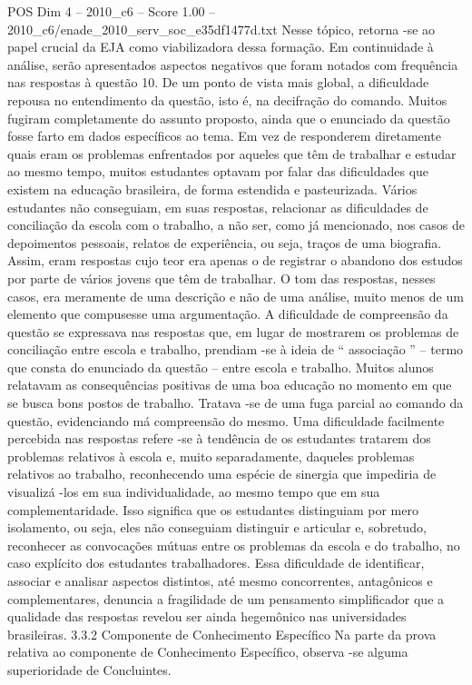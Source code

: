 \begin{textsample}{POS Dim 4 – 2010\_c6 – Score 1.00 – 2010\_c6/enade\_2010\_serv\_soc\_e35df1477d.txt}
Nesse tópico, retorna -se ao papel crucial da EJA como viabilizadora dessa formação.
Em continuidade à análise, serão apresentados aspectos negativos que foram notados com frequência nas respostas à questão 10.
De um ponto de vista mais global, a dificuldade repousa no entendimento da questão, isto é, na decifração do comando.
Muitos fugiram completamente do assunto proposto, ainda que o enunciado da questão fosse farto em dados específicos ao tema.
Em vez de responderem diretamente quais eram os problemas enfrentados por aqueles que têm de trabalhar e estudar ao mesmo tempo, muitos estudantes optavam por falar das dificuldades que existem na educação brasileira, de forma estendida e pasteurizada.
Vários estudantes não conseguiam, em suas respostas, relacionar as dificuldades de conciliação da escola com o trabalho, a não ser, como já mencionado, nos casos de depoimentos pessoais, relatos de experiência, ou seja, traços de uma biografia.
Assim, eram respostas cujo teor era apenas o de registrar o abandono dos estudos por parte de vários jovens que têm de trabalhar.
O tom das respostas, nesses casos, era meramente de uma descrição e não de uma análise, muito menos de um elemento que compusesse uma argumentação.
A dificuldade de compreensão da questão se expressava nas respostas que, em lugar de mostrarem os problemas de conciliação entre escola e trabalho, prendiam -se à ideia de “ associação ” – termo que consta do enunciado da questão – entre escola e trabalho.
Muitos alunos relatavam as consequências positivas de uma boa educação no momento em que se busca bons postos de trabalho.
Tratava -se de uma fuga parcial ao comando da questão, evidenciando má compreensão do mesmo.
Uma dificuldade facilmente percebida nas respostas refere -se à tendência de os estudantes tratarem dos problemas relativos à escola e, muito separadamente, daqueles problemas relativos ao trabalho, reconhecendo uma espécie de sinergia que impediria de visualizá -los em sua individualidade, ao mesmo tempo que em sua complementaridade.
Isso significa que os estudantes distinguiam por mero isolamento, ou seja, eles não conseguiam distinguir e articular e, sobretudo, reconhecer as convocações mútuas entre os problemas da escola e do trabalho, no caso explícito dos estudantes trabalhadores.
Essa dificuldade de identificar, associar e analisar aspectos distintos, até mesmo concorrentes, antagônicos e complementares, denuncia a fragilidade de um pensamento simplificador que a qualidade das respostas revelou ser ainda hegemônico nas universidades brasileiras. 3.3.2 Componente de Conhecimento Específico Na parte da prova relativa ao componente de Conhecimento Específico, observa -se alguma superioridade de Concluintes.

\end{textsample}
